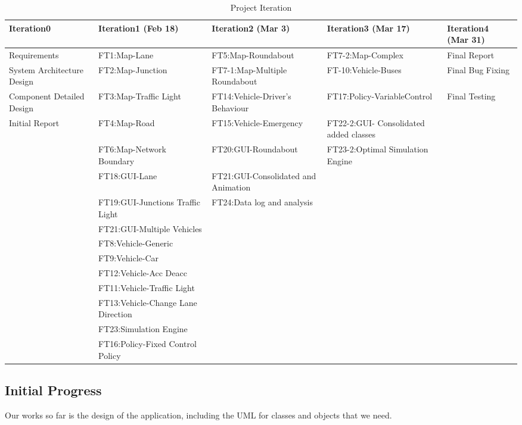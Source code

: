 \documentclass[11pt]{article}
\begin{document}
\begin{table}[h]
		\caption{Project Iteration}
		\centering
		\begin{tabular}{p{2.5cm}|p{4cm}|p{2.5cm}|p{2.5cm}|p{2cm}}
		\hline\hline
		Iteration0 & Iteration1 (Feb 18) & Iteration2 (Mar 3) & Iteration3 (Mar 17) & Iteration4 (Mar 31) \\ [0.5ex]
		\hline
		
		Requirements & FT1:Map-Lane & FT5:Map-Roundabout & FT7-2:Map-Complex & Final Report\\[1ex]
		
		System Architecture Design & FT2:Map-Junction & FT7-1:Map-Multiple Roundabout & FT-10:Vehicle-Buses & Final Bug Fixing\\ [1ex]
		
		Component Detailed Design & FT3:Map-Traffic Light & FT14:Vehicle-Driver's Behaviour & FT17:Policy-VariableControl & Final Testing\\ [1ex]
		
		Initial Report & FT4:Map-Road & FT15:Vehicle-Emergency & FT22-2:GUI- Consolidated added classes \\[1ex]
		
		& FT6:Map-Network Boundary & FT20:GUI-Roundabout & FT23-2:Optimal Simulation Engine \\[1ex] 
		
		& FT18:GUI-Lane & FT21:GUI-Consolidated and Animation & \\[1ex]
		
		& FT19:GUI-Junctions Traffic Light & FT24:Data log and analysis & &\\[1ex]
		& FT21:GUI-Multiple Vehicles &&&\\
		& FT8:Vehicle-Generic &&& \\
		& FT9:Vehicle-Car &&& \\
		& FT12:Vehicle-Acc Deacc &&& \\
		& FT11:Vehicle-Traffic Light &&& \\
		& FT13:Vehicle-Change Lane Direction &&& \\
		& FT23:Simulation Engine &&& \\
		& FT16:Policy-Fixed Control Policy &&&\\
		
		
		
		\hline
		\end{tabular}
		\label{table:iteration} 
		\end{table}

	
\subsection{Initial Progress}
Our works so far is the design of the application, including the UML for classes and objects that we need. 
\end{document}
